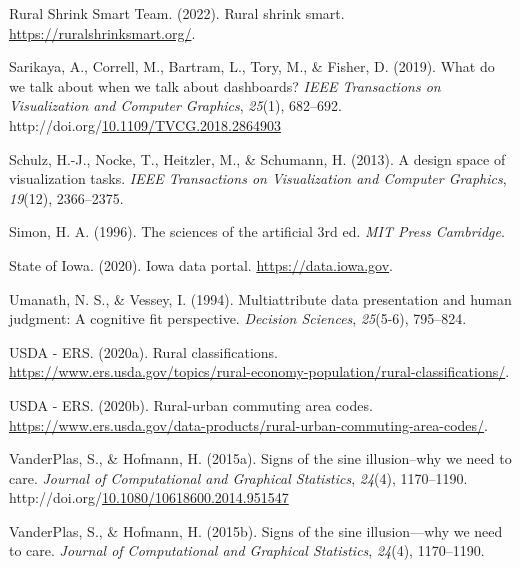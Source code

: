 \documentclass[print]{nuthesis}
\newlength{\cslhangindent}
\newenvironment{CSLReferences}[2]%
{\setlength{\parindent}{0pt}%
\everypar{\setlength{\hangindent}{\cslhangindent}}\ignorespaces}%
{\par}
\begin{document}
\begin{CSLReferences}{1}{0}
\leavevmode{}%
Rural Shrink Smart Team. (2022). Rural shrink smart. \url{https://ruralshrinksmart.org/}.

\leavevmode{}%
Sarikaya, A., Correll, M., Bartram, L., Tory, M., \& Fisher, D. (2019). What do we talk about when we talk about dashboards? \emph{IEEE Transactions on Visualization and Computer Graphics}, \emph{25}(1), 682--692. http://doi.org/\href{https://doi.org/10.1109/TVCG.2018.2864903}{10.1109/TVCG.2018.2864903}

\leavevmode{}%
Schulz, H.-J., Nocke, T., Heitzler, M., \& Schumann, H. (2013). A design space of visualization tasks. \emph{IEEE Transactions on Visualization and Computer Graphics}, \emph{19}(12), 2366--2375.

\leavevmode{}%
Simon, H. A. (1996). The sciences of the artificial 3rd ed. \emph{MIT Press Cambridge}.

\leavevmode{}%
State of Iowa. (2020). Iowa data portal. \url{https://data.iowa.gov}.

\leavevmode{}%
Umanath, N. S., \& Vessey, I. (1994). Multiattribute data presentation and human judgment: A cognitive fit perspective. \emph{Decision Sciences}, \emph{25}(5-6), 795--824.

\leavevmode{}%
USDA - ERS. (2020a). Rural classifications. \url{https://www.ers.usda.gov/topics/rural-economy-population/rural-classifications/}.

\leavevmode{}%
USDA - ERS. (2020b). Rural-urban commuting area codes. \url{https://www.ers.usda.gov/data-products/rural-urban-commuting-area-codes/}.

\leavevmode{}%
VanderPlas, S., \& Hofmann, H. (2015a). Signs of the sine illusion--why we need to care. \emph{Journal of Computational and Graphical Statistics}, \emph{24}(4), 1170--1190. http://doi.org/\href{https://doi.org/10.1080/10618600.2014.951547}{10.1080/10618600.2014.951547}

\leavevmode{}%
VanderPlas, S., \& Hofmann, H. (2015b). Signs of the sine illusion---why we need to care. \emph{Journal of Computational and Graphical Statistics}, \emph{24}(4), 1170--1190.


\end{CSLReferences}
\end{document}
